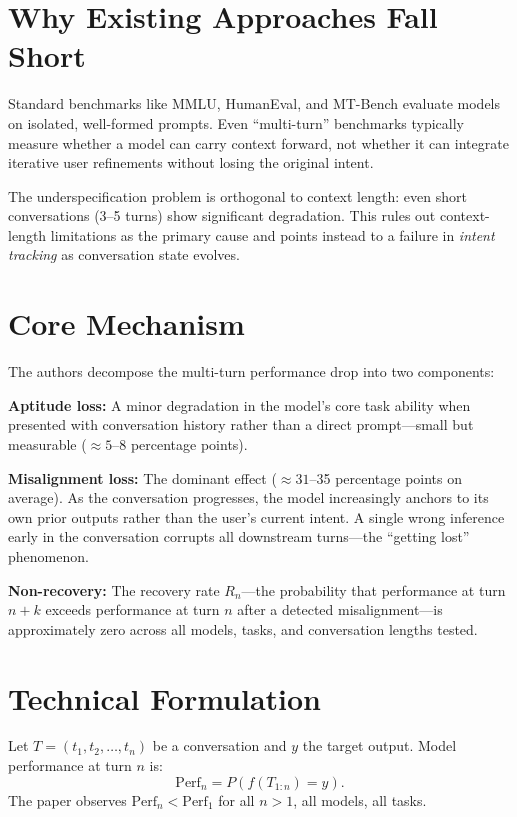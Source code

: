 \documentclass[10pt,twocolumn]{article}
\begin{document}
\section{Why Existing Approaches Fall Short}

Standard benchmarks like MMLU, HumanEval, and MT-Bench evaluate models
on isolated, well-formed prompts. Even ``multi-turn'' benchmarks typically
measure whether a model can carry context forward, not whether it can
integrate iterative user refinements without losing the original intent.

The underspecification problem is orthogonal to context length: even short
conversations (3--5 turns) show significant degradation. This rules out
context-length limitations as the primary cause and points instead to a
failure in \emph{intent tracking} as conversation state evolves.

\section{Core Mechanism}

The authors decompose the multi-turn performance drop into two components:

\textbf{Aptitude loss:} A minor degradation in the model's core task ability
when presented with conversation history rather than a direct prompt---small
but measurable ($\approx 5$--8 percentage points).

\textbf{Misalignment loss:} The dominant effect ($\approx 31$--35 percentage
points on average). As the conversation progresses, the model increasingly
anchors to its own prior outputs rather than the user's current intent.
A single wrong inference early in the conversation corrupts all downstream
turns---the ``getting lost'' phenomenon.

\textbf{Non-recovery:} The recovery rate $R_n$---the probability that
performance at turn $n+k$ exceeds performance at turn $n$ after a detected
misalignment---is approximately zero across all models, tasks, and
conversation lengths tested.

\section{Technical Formulation}

Let $T = (t_1, t_2, \ldots, t_n)$ be a conversation and $y$ the target
output. Model performance at turn $n$ is:
\[
\text{Perf}_n = P\!\left(f(T_{1:n}) = y\right).
\]
The paper observes $\text{Perf}_n < \text{Perf}_1$ for all $n > 1$, all
models, all tasks.
\end{document}
